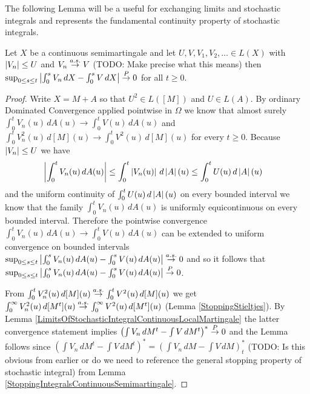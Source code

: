 The following Lemma will be a useful for exchanging limits and stochastic integrals and represents the fundamental continuity property of stochastic integrals.
\begin{lem}\label{LimitsOfStochasticIntegralContinuousSemimartingale}Let $X$ be a continuous semimartingale and let $U, V, V_1, V_2, \dotsc \in L(X)$ with $\left \vert V_n \right \vert \leq U$ and $V_n \overset{a.s.}\to V$ (TODO: Make precise what this means) then $\sup_{0 \leq s \leq t} \left \vert \int_0^s V_n \, dX - \int_0^s V \, dX \right \vert \overset{P}\to 0$ for all $t \geq 0$.
\end{lem}
\begin{proof}
Write $X = M + A$ so that $U^2 \in L([M])$ and $U \in L(A)$.  By ordinary Dominated Convergence applied pointwise in $\Omega$ we know that almost surely $\int_0^t V_n(u) \, dA(u) \to \int_0^t V(u) \, dA(u)$ and $\int_0^t V_n^2(u) \, d[M](u) \to \int_0^t V^2(u) \, d[M](u)$ for every $t \geq 0$.  Because $\left \vert V_n \right \vert \leq U$ we have
\begin{align*}
\left \vert \int_0^t V_n(u) \, dA(u) \right \vert &\leq \int_0^t \left \vert V_n(u) \right \vert \, d\left \vert A \right \vert(u) \leq \int_0^t U(u) \, d\left \vert A \right \vert(u)
\end{align*}
and the uniform continuity of $\int_0^t U(u) \, d\left \vert A \right \vert(u)$ on every bounded interval we know that the family $\int_0^t V_n(u) \, dA(u)$ is uniformly equicontinuous on every bounded interval.  Therefore the pointwise convergence $\int_0^t V_n(u) \, dA(u) \to \int_0^t V(u) \, dA(u)$ can be extended to uniform convergence on bounded intervals $\sup_{0 \leq s \leq t} \left \vert \int_0^s V_n(u) \, dA(u) - \int_0^s V(u) \, dA(u) \right \vert \overset{a.s.}\to 0$ and so it follows that $\sup_{0 \leq s \leq t} \left \vert \int_0^s V_n(u) \, dA(u) - \int_0^s V(u) \, dA(u) \right \vert \overset{P}\to 0$.

From $\int_0^t V_n^2(u) \, d[M](u) \overset{a.s.}\to \int_0^t V^2(u) \, d[M](u)$ we get $\int_0^\infty V_n^2(u) \, d[M^t](u) \overset{a.s.}\to \int_0^\infty V^2(u) \, d[M^t](u)$ (Lemma \ref{StoppingStieltjes}).  By Lemma \ref{LimitsOfStochasticIntegralContinuousLocalMartingale} the latter convergence statement implies $\left(\int V_n \, dM^t  - \int V \, dM^t\right)^* \overset{P}\to 0$ and the Lemma follows since $\left(\int V_n \, dM^t  - \int V \, dM^t\right)^* = \left(\int V_n \, dM  - \int V \, dM\right)_t^*$ (TODO: Is this obvious from earlier or do we need to reference the general stopping property of stochastic integral) from Lemma \ref{StoppingIntegralsContinuousSemimartingale}.
\end{proof}

